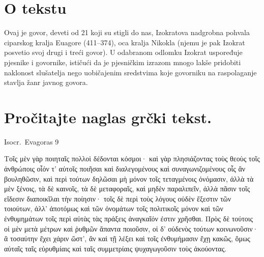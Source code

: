 

\section*{O tekstu}

Ovaj je govor, deveti od 21 koji su stigli do nas, Izokratova nadgrobna pohvala ciparskog kralja Euagore (411–374), oca kralja Nikokla (njemu je pak Izokrat posvetio svoj drugi i treći govor). U odabranom odlomku Izokrat uspoređuje pjesnike i govornike, ističući da je pjesničkim izrazom mnogo lakše pridobiti  naklonost slušatelja nego uobičajenim sredstvima koje govorniku na raspolaganje stavlja žanr javnog govora.


\section*{Pročitajte naglas grčki tekst.}


Isocr.\ Evagoras 9

\medskip

{\large
\begin{greek}
\noindent Τοῖς μὲν γὰρ ποιηταῖς πολλοὶ δέδονται κόσμοι· καὶ γὰρ πλησιάζοντας τοὺς θεοὺς τοῖς ἀνθρώποις οἷόν τ' αὐτοῖς ποιῆσαι καὶ διαλεγομένους καὶ συναγωνιζομένους οἷς ἂν βουληθῶσιν, καὶ περὶ τούτων δηλῶσαι μὴ μόνον τοῖς τεταγμένοις ὀνόμασιν, ἀλλὰ τὰ μὲν ξένοις, τὰ δὲ καινοῖς, τὰ δὲ μεταφοραῖς, καὶ μηδὲν παραλιπεῖν, ἀλλὰ πᾶσιν τοῖς εἴδεσιν διαποικῖλαι τὴν ποίησιν· τοῖς δὲ περὶ τοὺς λόγους οὐδὲν ἔξεστιν τῶν τοιούτων, ἀλλ' ἀποτόμως καὶ τῶν ὀνομάτων τοῖς πολιτικοῖς μόνον καὶ τῶν ἐνθυμημάτων τοῖς περὶ αὐτὰς τὰς πράξεις ἀναγκαῖόν ἐστιν χρῆσθαι. Πρὸς δὲ τούτοις οἱ μὲν μετὰ μέτρων καὶ ῥυθμῶν ἅπαντα ποιοῦσιν, οἱ δ' οὐδενὸς τούτων κοινωνοῦσιν· ἃ τοσαύτην ἔχει χάριν ὥστ', ἂν καὶ τῇ λέξει καὶ τοῖς ἐνθυμήμασιν ἔχῃ κακῶς, ὅμως αὐταῖς ταῖς εὐρυθμίαις καὶ ταῖς συμμετρίαις ψυχαγωγοῦσιν τοὺς ἀκούοντας.

\end{greek}

}

